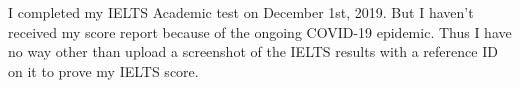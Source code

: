 
I completed my IELTS Academic test on December 1st, 2019.
But I haven't received my score report because of the ongoing COVID-19 epidemic.
Thus I have no way other than upload a screenshot of the IELTS results with a reference ID on it to prove my IELTS score.